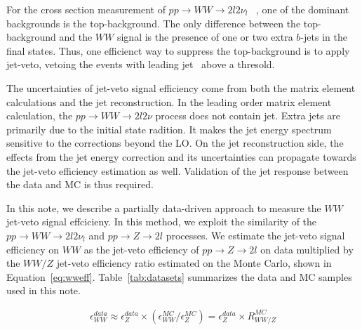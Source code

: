 For the cross section measurement of $pp\to WW\to 2l 2\nu_l$
~\cite{wwanalysis}, one of the dominant backgrounds is the top-background. 
The only difference between the top-background and the $WW$ signal is the 
presence of one or two extra $b$-jets in the final states. Thus, one 
efficienct way to suppress the top-background is to apply 
jet-veto, vetoing the events with leading jet \pt\, above a thresold. 

The uncertainties of jet-veto signal efficiency come from 
both the matrix element calculations %
and the jet reconstruction. %
In the leading order matrix element calculation, 
the $pp\to WW\to 2l2\nu$ process does not contain jet.
Extra jets are primarily due to the initial 
state radition. It makes the jet energy spectrum 
sensitive to the corrections beyond the LO. 
On the jet reconstruction side, the effects from the jet energy correction 
and its uncertainties can propagate towards the jet-veto efficiency 
estimation as well. Validation of the jet response between the 
data and MC is thus required. 

In this note, we describe a partially data-driven approach to 
measure the $WW$ jet-veto signal effcicieny.
In this method, we exploit the similarity of the 
$pp\to WW\to 2l 2\nu_l$ and $pp\to Z\to 2l$ processes.
We estimate the jet-veto signal efficiency on $WW$ 
as the jet-veto efficiency of
$pp\to Z\to 2l$ on data multiplied by the $WW/Z$ jet-veto efficiency 
ratio estimated on the Monte Carlo, shown in Equation~\ref{eq:wweff}. 
Table~\ref{tab:datasets} summarizes the data and MC samples used in this note. 

\begin{eqnarray}
\epsilon_{WW}^{data} 
\approx {\epsilon_Z^{data}} \times ({\epsilon_{WW}^{MC}}/{\epsilon_Z^{MC}}) = {\epsilon_Z^{data}} \times R_{WW/Z}^{MC}  
\label{eq:wweff}
\end{eqnarray}


